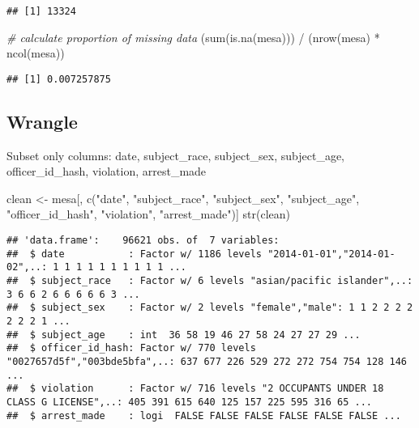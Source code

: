 \documentclass[
]{article}
\newenvironment{Shaded}{\begin{snugshade}}{\end{snugshade}}
\newcommand{\CommentTok}[1]{\textcolor[rgb]{0.56,0.35,0.01}{\textit{#1}}}
\newcommand{\FunctionTok}[1]{\textcolor[rgb]{0.00,0.00,0.00}{#1}}
\newcommand{\NormalTok}[1]{#1}
\newcommand{\OtherTok}[1]{\textcolor[rgb]{0.56,0.35,0.01}{#1}}
\newcommand{\SpecialCharTok}[1]{\textcolor[rgb]{0.00,0.00,0.00}{#1}}
\newcommand{\StringTok}[1]{\textcolor[rgb]{0.31,0.60,0.02}{#1}}
\begin{document}
\begin{verbatim}
## [1] 13324
\end{verbatim}

\begin{Shaded}
\begin{Highlighting}[]
\CommentTok{\# calculate proportion of missing data}
\NormalTok{(}\FunctionTok{sum}\NormalTok{(}\FunctionTok{is.na}\NormalTok{(mesa))) }\SpecialCharTok{/}\NormalTok{ (}\FunctionTok{nrow}\NormalTok{(mesa) }\SpecialCharTok{*} \FunctionTok{ncol}\NormalTok{(mesa))}
\end{Highlighting}
\end{Shaded}

\begin{verbatim}
## [1] 0.007257875
\end{verbatim}

\hypertarget{wrangle}{%
\subsection{Wrangle}\label{wrangle}}

Subset only columns: date, subject\_race, subject\_sex, subject\_age,
officer\_id\_hash, violation, arrest\_made

\begin{Shaded}
\begin{Highlighting}[]
\NormalTok{clean }\OtherTok{\textless{}{-}}\NormalTok{ mesa[, }\FunctionTok{c}\NormalTok{(}\StringTok{"date"}\NormalTok{, }\StringTok{"subject\_race"}\NormalTok{, }\StringTok{"subject\_sex"}\NormalTok{, }\StringTok{"subject\_age"}\NormalTok{, }\StringTok{"officer\_id\_hash"}\NormalTok{, }\StringTok{"violation"}\NormalTok{, }\StringTok{"arrest\_made"}\NormalTok{)]}
\FunctionTok{str}\NormalTok{(clean)}
\end{Highlighting}
\end{Shaded}

\begin{verbatim}
## 'data.frame':    96621 obs. of  7 variables:
##  $ date           : Factor w/ 1186 levels "2014-01-01","2014-01-02",..: 1 1 1 1 1 1 1 1 1 1 ...
##  $ subject_race   : Factor w/ 6 levels "asian/pacific islander",..: 3 6 6 2 6 6 6 6 6 3 ...
##  $ subject_sex    : Factor w/ 2 levels "female","male": 1 1 2 2 2 2 2 2 2 1 ...
##  $ subject_age    : int  36 58 19 46 27 58 24 27 27 29 ...
##  $ officer_id_hash: Factor w/ 770 levels "0027657d5f","003bde5bfa",..: 637 677 226 529 272 272 754 754 128 146 ...
##  $ violation      : Factor w/ 716 levels "2 OCCUPANTS UNDER 18 CLASS G LICENSE",..: 405 391 615 640 125 157 225 595 316 65 ...
##  $ arrest_made    : logi  FALSE FALSE FALSE FALSE FALSE FALSE ...
\end{verbatim}
\end{document}
